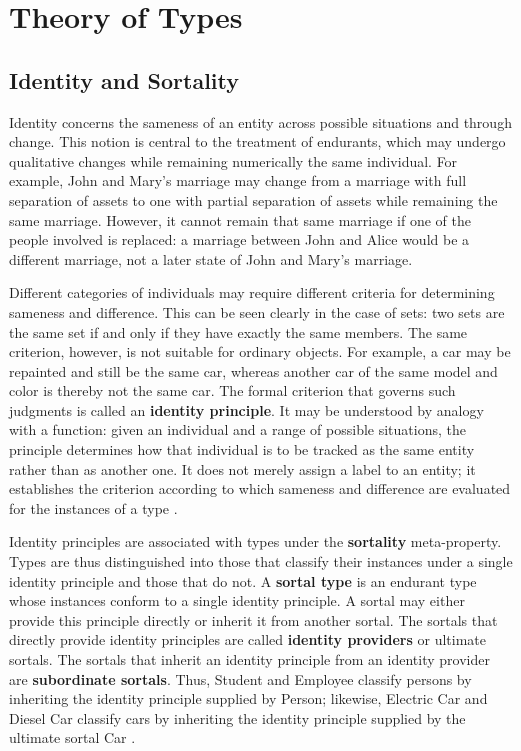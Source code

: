 \section{Theory of Types}

\subsection{Identity and Sortality}
\label{sec:identity-sortality}

Identity concerns the sameness of an entity across possible situations and through change. This notion is central to the treatment of endurants, which may undergo qualitative changes while remaining numerically the same individual. For example, John and Mary's marriage may change from a marriage with full separation of assets to one with partial separation of assets while remaining the same marriage. However, it cannot remain that same marriage if one of the people involved is replaced: a marriage between John and Alice would be a different marriage, not a later state of John and Mary's marriage.

Different categories of individuals may require different criteria for determining sameness and difference. This can be seen clearly in the case of sets: two sets are the same set if and only if they have exactly the same members. The same criterion, however, is not suitable for ordinary objects. For example, a car may be repainted and still be the same car, whereas another car of the same model and color is thereby not the same car. The formal criterion that governs such judgments is called an \textbf{identity principle}. It may be understood by analogy with a function: given an individual and a range of possible situations, the principle determines how that individual is to be tracked as the same entity rather than as another one. It does not merely assign a label to an entity; it establishes the criterion according to which sameness and difference are evaluated for the instances of a type \cite{ontological_foundations_for_structural_conceptual_models_2005}.

Identity principles are associated with types under the \textbf{sortality} meta-property. Types are thus distinguished into those that classify their instances under a single identity principle and those that do not. A \textbf{sortal type} is an endurant type whose instances conform to a single identity principle. A sortal may either provide this principle directly or inherit it from another sortal. The sortals that directly provide identity principles are called \textbf{identity providers} or ultimate sortals. The sortals that inherit an identity principle from an identity provider are \textbf{subordinate sortals}. Thus, Student and Employee classify persons by inheriting the identity principle supplied by Person; likewise, Electric Car and Diesel Car classify cars by inheriting the identity principle supplied by the ultimate sortal Car \cite{types_and_taxonomic_structures_in_conceptual_modeling_2021}.


